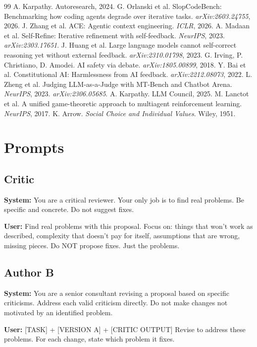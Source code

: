 \documentclass[10pt,twocolumn]{article}
\begin{document}
\begin{thebibliography}{99}
\small
{} A. Karpathy. Autoresearch, 2024.
 G. Orlanski et al. SlopCodeBench: Benchmarking how coding agents degrade over iterative tasks. \textit{arXiv:2603.24755}, 2026.
 J. Zhang et al. ACE: Agentic context engineering. \textit{ICLR}, 2026.
 A. Madaan et al. Self-Refine: Iterative refinement with self-feedback. \textit{NeurIPS}, 2023. \textit{arXiv:2303.17651}.
 J. Huang et al. Large language models cannot self-correct reasoning yet without external feedback. \textit{arXiv:2310.01798}, 2023.
 G. Irving, P. Christiano, D. Amodei. AI safety via debate. \textit{arXiv:1805.00899}, 2018.
 Y. Bai et al. Constitutional AI: Harmlessness from AI feedback. \textit{arXiv:2212.08073}, 2022.
 L. Zheng et al. Judging LLM-as-a-Judge with MT-Bench and Chatbot Arena. \textit{NeurIPS}, 2023. \textit{arXiv:2306.05685}.
 A. Karpathy. LLM Council, 2025.
 M. Lanctot et al. A unified game-theoretic approach to multiagent reinforcement learning. \textit{NeurIPS}, 2017.
 K. Arrow. \textit{Social Choice and Individual Values}. Wiley, 1951.
\end{thebibliography}

\onecolumn
\appendix

\section{Prompts}
\label{app:prompts}

\subsection{Critic}
\begin{tcolorbox}[promptbox]
\textbf{System:} You are a critical reviewer. Your only job is to find real problems. Be specific and concrete. Do not suggest fixes.

\textbf{User:} Find real problems with this proposal. Focus on: things that won't work as described, complexity that doesn't pay for itself, assumptions that are wrong, missing pieces. Do NOT propose fixes. Just the problems.
\end{tcolorbox}

\subsection{Author B}
\begin{tcolorbox}[promptbox]
\textbf{System:} You are a senior consultant revising a proposal based on specific criticisms. Address each valid criticism directly. Do not make changes not motivated by an identified problem.

\textbf{User:} [TASK] + [VERSION A] + [CRITIC OUTPUT]
Revise to address these problems. For each change, state which problem it fixes.
\end{tcolorbox}
\end{document}

